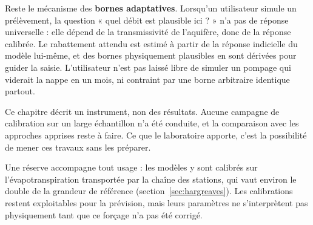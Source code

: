 Reste le mécanisme des \textbf{bornes adaptatives}. Lorsqu'un utilisateur
simule un prélèvement, la question « quel débit est plausible ici ? » n'a pas de réponse
universelle : elle dépend de la transmissivité de l'aquifère, donc de la réponse calibrée. Le
rabattement attendu est estimé à partir de la réponse indicielle du modèle lui-même, et des
bornes physiquement plausibles en sont dérivées pour guider la saisie. L'utilisateur n'est pas
laissé libre de simuler un pompage qui viderait la nappe en un mois, ni contraint par une borne
arbitraire identique partout.

Ce chapitre décrit un instrument, non des résultats. Aucune campagne de calibration sur un large
échantillon n'a été conduite, et la comparaison avec les approches apprises reste à faire. Ce
que le laboratoire apporte, c'est la possibilité de mener ces travaux sans les préparer.

Une réserve accompagne tout usage : les modèles y sont calibrés sur l'évapotranspiration
transportée par la chaîne des stations, qui vaut environ le double de la grandeur de référence
(section~\ref{sec:hargreaves}). Les calibrations restent exploitables pour la prévision, mais
leurs paramètres ne s'interprètent pas physiquement tant que ce forçage n'a pas été corrigé.
